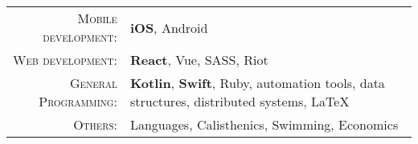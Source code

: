 %
%
%

\begin{tabular}{rl}
    \textsc{Mobile development:} & \textbf{iOS}, Android \\
    \textsc{Web development:} & \textbf{React}, Vue, SASS, Riot \\ 
    \textsc{General Programming:} & \textbf{Kotlin}, \textbf{Swift}, Ruby, automation tools, data structures, distributed systems, LaTeX \\ 
    \textsc{Others:} & Languages, Calisthenics, Swimming, Economics \\
\end{tabular}
